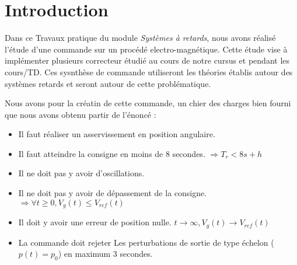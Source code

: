 \chapter*{Introduction}
\label{chap:Intro}
Dans ce Travaux pratique du module \emph{Systèmes à retards}, nous avons réalisé l'étude d'une commande sur un procédé electro-magnétique. Cette étude vise à implémenter plusieurs correcteur étudié au cours de notre cursus et pendant les cours/TD. Ces sysnthèse de commande utiliseront les théories établis autour des systèmes  retards et seront autour de cette problématique.

Nous avons pour la créatin de cette commande, un chier des charges bien fourni que nous avons obtenu  partir de l'énoncé :
\begin{itemize}
\item Il faut réaliser un asservissement en position angulaire.
\item Il faut atteindre la consigne en moins de 8 secondes. $\Rightarrow T_r<8s + h $
\item Il ne doit pas y avoir d'oscillations.
\item Il ne doit pas y avoir de dépassement de la consigne.$\Rightarrow \forall t \geq 0, V_g(t)\leq V_{ref}(t)$
\item Il doit y avoir une erreur de position nulle. $ t\rightarrow \infty, V_g(t) \rightarrow V_{ref}(t)$
\item La commande doit rejeter Les perturbations de sortie de type échelon ($p(t)=p_0$) en maximum 3 secondes.
\end{itemize}